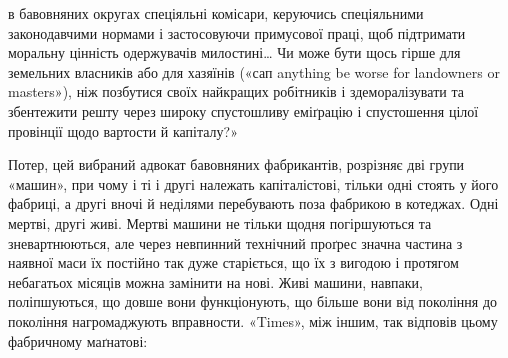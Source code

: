 \parcont{}  %
в бавовняних округах спеціяльні комісари, керуючись спеціяльними
законодавчими нормами і застосовуючи примусової праці,
щоб підтримати моральну цінність одержувачів милостині\dots{}
Чи може бути щось гірше для земельних власників або для хазяїнів
(«сап anything be worse for landowners or masters»), ніж
позбутися своїх найкращих робітників і здеморалізувати та
збентежити решту через широку спустошливу еміґрацію і спустошення
цілої провінції щодо вартости й капіталу?»

Потер, цей вибраний адвокат бавовняних фабрикантів, розрізняє
дві групи «машин», при чому і ті і другі належать капіталістові,
тільки одні стоять у його фабриці, а другі вночі й
неділями перебувають поза фабрикою в котеджах. Одні мертві,
другі живі. Мертві машини не тільки щодня погіршуються та
зневартнюються, але через невпинний технічний проґрес значна
частина з наявної маси їх постійно так дуже старіється, що їх
з вигодою і протягом небагатьох місяців можна замінити на нові.
Живі машини, навпаки, поліпшуються, що довше вони функціонують,
що більше вони від покоління до покоління нагромаджують
вправности. «Times», між іншим, так відповів цьому
фабричному маґнатові:

